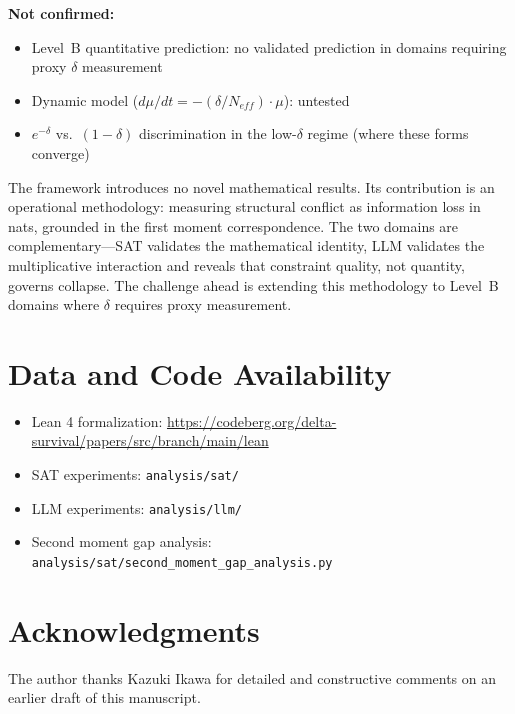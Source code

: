 \documentclass[11pt,a4paper]{article}
\begin{document}
\textbf{Not confirmed:}
\begin{itemize}
    \item Level~B quantitative prediction: no validated prediction in domains requiring proxy $\delta$ measurement
    \item Dynamic model ($d\mu/dt = -(\delta/N_{eff}) \cdot \mu$): untested
    \item $e^{-\delta}$ vs.\ $(1-\delta)$ discrimination in the low-$\delta$ regime (where these forms converge)
\end{itemize}

The framework introduces no novel mathematical results. Its contribution is an operational methodology: measuring structural conflict as information loss in nats, grounded in the first moment correspondence. The two domains are complementary---SAT validates the mathematical identity, LLM validates the multiplicative interaction and reveals that constraint quality, not quantity, governs collapse. The challenge ahead is extending this methodology to Level~B domains where $\delta$ requires proxy measurement.

\section*{Data and Code Availability}

\begin{itemize}
    \item Lean 4 formalization: \url{https://codeberg.org/delta-survival/papers/src/branch/main/lean}
    \item SAT experiments: \texttt{analysis/sat/}
    \item LLM experiments: \texttt{analysis/llm/}
    \item Second moment gap analysis: \texttt{analysis/sat/second\_moment\_gap\_analysis.py}
\end{itemize}

\section*{Acknowledgments}
The author thanks Kazuki Ikawa for detailed and constructive comments on an earlier draft of this manuscript.
\end{document}
